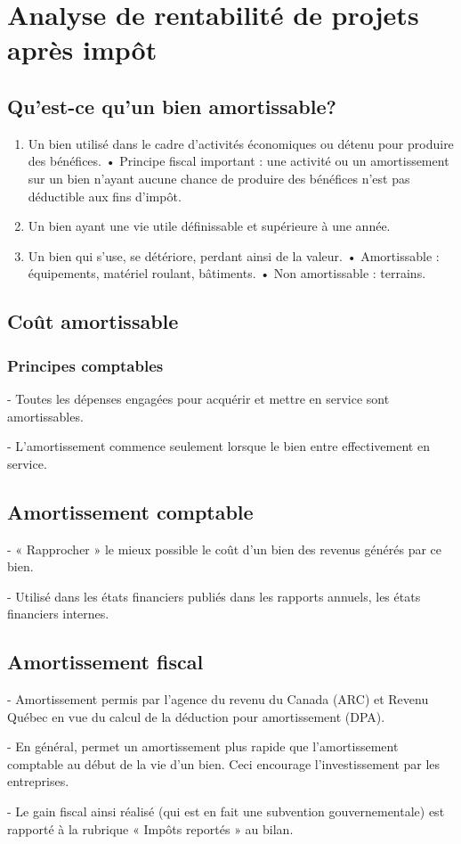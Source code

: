 \section{Analyse de rentabilité de projets après impôt}
\subsection{Qu’est-ce qu’un bien amortissable?}
\begin{enumerate}
    \item Un bien utilisé dans le cadre d’activités économiques ou détenu pour produire des bénéfices. • Principe fiscal important : une activité ou un amortissement sur un bien n’ayant aucune chance de produire des bénéfices n’est pas déductible aux fins d’impôt.
    \item Un bien ayant une vie utile définissable et supérieure à une année.
    \item Un bien qui s’use, se détériore, perdant ainsi de la valeur. • Amortissable : équipements, matériel roulant, bâtiments. • Non amortissable : terrains.
\end{enumerate}


\subsection{Coût amortissable}
\subsubsection{Principes comptables}
- Toutes les dépenses engagées pour acquérir et mettre en service sont amortissables.

- L’amortissement commence seulement lorsque le bien entre effectivement en service.


\subsection{Amortissement comptable}
- « Rapprocher » le mieux possible le coût d’un bien des revenus générés par ce bien.

- Utilisé dans les états financiers publiés dans les rapports annuels, les états financiers internes.

\subsection{Amortissement fiscal}
- Amortissement permis par l’agence du revenu du Canada (ARC) et Revenu Québec en vue du calcul de la déduction pour amortissement (DPA).

- En général, permet un amortissement plus rapide que l’amortissement comptable au début de la vie d’un bien. Ceci encourage l’investissement par les entreprises.

- Le gain fiscal ainsi réalisé (qui est en fait une subvention gouvernementale) est rapporté à la rubrique « Impôts reportés » au bilan.